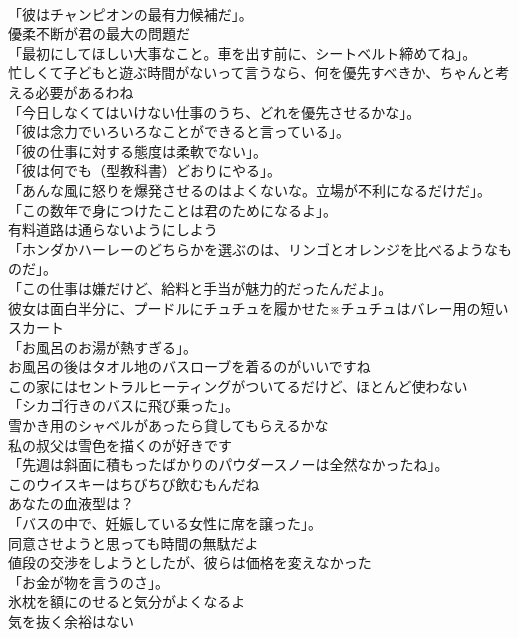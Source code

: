\documentclass[8pt]{extreport}
\begin{document}
\begin{CJK}{UTF8}{min}
\\	「彼はチャンピオンの最有力候補だ」。	
\\	優柔不断が君の最大の問題だ	
\\	「最初にしてほしい大事なこと。車を出す前に、シートベルト締めてね」。	
\\	忙しくて子どもと遊ぶ時間がないって言うなら、何を優先すべきか、ちゃんと考える必要があるわね	
\\	「今日しなくてはいけない仕事のうち、どれを優先させるかな」。	
\\	「彼は念力でいろいろなことができると言っている」。	
\\	「彼の仕事に対する態度は柔軟でない」。	
\\	「彼は何でも（型教科書）どおりにやる」。	
\\	「あんな風に怒りを爆発させるのはよくないな。立場が不利になるだけだ」。	
\\	「この数年で身につけたことは君のためになるよ」。	
\\	有料道路は通らないようにしよう	
\\	「ホンダかハーレーのどちらかを選ぶのは、リンゴとオレンジを比べるようなものだ」。	
\\	「この仕事は嫌だけど、給料と手当が魅力的だったんだよ」。	
\\	彼女は面白半分に、プードルにチュチュを履かせた※チュチュはバレー用の短いスカート	
\\	「お風呂のお湯が熱すぎる」。	
\\	お風呂の後はタオル地のバスローブを着るのがいいですね	
\\	この家にはセントラルヒーティングがついてるだけど、ほとんど使わない	
\\	「シカゴ行きのバスに飛び乗った」。	
\\	雪かき用のシャベルがあったら貸してもらえるかな	
\\	私の叔父は雪色を描くのが好きです	
\\	「先週は斜面に積もったばかりのパウダースノーは全然なかったね」。	
\\	このウイスキーはちびちび飲むもんだね	
\\	あなたの血液型は？	
\\	「バスの中で、妊娠している女性に席を譲った」。	
\\	同意させようと思っても時間の無駄だよ	
\\	値段の交渉をしようとしたが、彼らは価格を変えなかった	
\\	「お金が物を言うのさ」。	
\\	氷枕を額にのせると気分がよくなるよ	
\\	気を抜く余裕はない	

\end{CJK}
\end{document}
